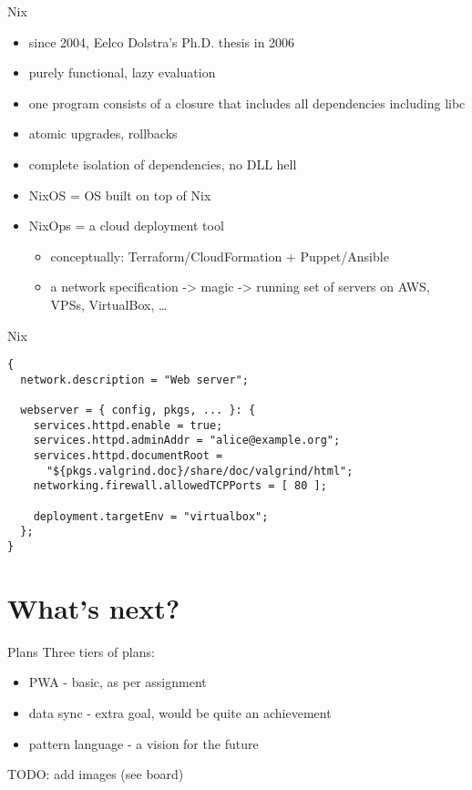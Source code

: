 \documentclass[presentation]{beamer}
\begin{document}
\begin{frame}[label={sec:org7007353}]{Nix}
\begin{itemize}
\item since 2004, Eelco Dolstra's Ph.D. thesis in 2006
\item purely functional, lazy evaluation
\item one program consists of a closure that includes all dependencies including libc
\item atomic upgrades, rollbacks
\item complete isolation of dependencies, no DLL hell
\item NixOS = OS built on top of Nix
\item NixOps = a cloud deployment tool
\begin{itemize}
\item conceptually: Terraform/CloudFormation + Puppet/Ansible
\item a network specification -> magic -> running set of servers on AWS, VPSs,
VirtualBox, \ldots{}
\end{itemize}
\end{itemize}
\end{frame}

\begin{frame}[fragile,label={sec:orgf6e3cdc}]{Nix}
 \begin{verbatim}
{
  network.description = "Web server";

  webserver = { config, pkgs, ... }: {
    services.httpd.enable = true;
    services.httpd.adminAddr = "alice@example.org";
    services.httpd.documentRoot =
      "${pkgs.valgrind.doc}/share/doc/valgrind/html";
    networking.firewall.allowedTCPPorts = [ 80 ];

    deployment.targetEnv = "virtualbox";
  };
}
\end{verbatim}
\end{frame}

\section{What's next?}
\label{sec:orgf1c2e72}
\begin{frame}[label={sec:org9aea2f6}]{Plans}
Three tiers of plans:
\begin{itemize}
\item PWA - basic, as per assignment
\item data sync - extra goal, would be quite an achievement
\item pattern language - a vision for the future
\end{itemize}

TODO: add images (see board)
\end{frame}
\end{document}
